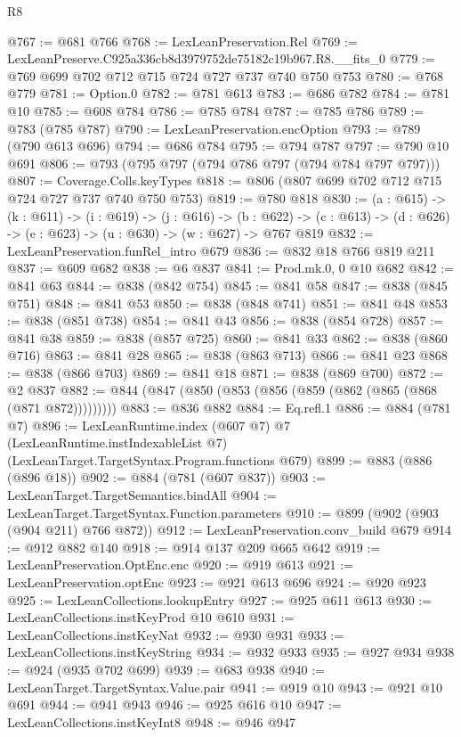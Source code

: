 \begin{lexlean}{R8}
\begin{coremodule}
@767 := @681 @766
@768 := LexLeanPreservation.Rel
@769 := LexLeanPreserve.C925a336cb8d3979752de75182c19b967.R8.__fits_0
@779 := @769 @699 @702 @712 @715 @724 @727 @737 @740 @750 @753
@780 := @768 @779
@781 := Option.{0}
@782 := @781 @613
@783 := @686 @782
@784 := @781 @10
@785 := @608 @784
@786 := @785 @784
@787 := @785 @786
@789 := @783 (@785 @787)
@790 := LexLeanPreservation.encOption
@793 := @789 (@790 @613 @696)
@794 := @686 @784
@795 := @794 @787
@797 := @790 @10 @691
@806 := @793 (@795 @797 (@794 @786 @797 (@794 @784 @797 @797)))
@807 := Coverage.Colls.keyTypes
@818 := @806 (@807 @699 @702 @712 @715 @724 @727 @737 @740 @750 @753)
@819 := @780 @818
@830 := (a : @615) ->
  (k : @611) ->
  (i : @619) ->
  (j : @616) ->
  (b : @622) -> (c : @613) -> (d : @626) -> (e : @623) -> (u : @630) -> (w : @627) -> @767 @819
@832 := LexLeanPreservation.funRel_intro @679
@836 := @832 @18 @766 @819 @211
@837 := @609 @682
@838 := @6 @837
@841 := Prod.mk.{0, 0} @10 @682
@842 := @841 @63
@844 := @838 (@842 @754)
@845 := @841 @58
@847 := @838 (@845 @751)
@848 := @841 @53
@850 := @838 (@848 @741)
@851 := @841 @48
@853 := @838 (@851 @738)
@854 := @841 @43
@856 := @838 (@854 @728)
@857 := @841 @38
@859 := @838 (@857 @725)
@860 := @841 @33
@862 := @838 (@860 @716)
@863 := @841 @28
@865 := @838 (@863 @713)
@866 := @841 @23
@868 := @838 (@866 @703)
@869 := @841 @18
@871 := @838 (@869 @700)
@872 := @2 @837
@882 := @844 (@847 (@850 (@853 (@856 (@859 (@862 (@865 (@868 (@871 @872)))))))))
@883 := @836 @882
@884 := Eq.refl.{1}
@886 := @884 (@781 @7)
@896 := LexLeanRuntime.index
    (@607 @7)
    @7
    (LexLeanRuntime.instIndexableList @7)
    (LexLeanTarget.TargetSyntax.Program.functions @679)
@899 := @883 (@886 (@896 @18))
@902 := @884 (@781 (@607 @837))
@903 := LexLeanTarget.TargetSemantics.bindAll
@904 := LexLeanTarget.TargetSyntax.Function.parameters
@910 := @899 (@902 (@903 (@904 @211) @766 @872))
@912 := LexLeanPreservation.conv_build @679
@914 := @912 @882 @140
@918 := @914 @137 @209 @665 @642
@919 := LexLeanPreservation.OptEnc.enc
@920 := @919 @613
@921 := LexLeanPreservation.optEnc
@923 := @921 @613 @696
@924 := @920 @923
@925 := LexLeanCollections.lookupEntry
@927 := @925 @611 @613
@930 := LexLeanCollections.instKeyProd @10 @610
@931 := LexLeanCollections.instKeyNat
@932 := @930 @931
@933 := LexLeanCollections.instKeyString
@934 := @932 @933
@935 := @927 @934
@938 := @924 (@935 @702 @699)
@939 := @683 @938
@940 := LexLeanTarget.TargetSyntax.Value.pair
@941 := @919 @10
@943 := @921 @10 @691
@944 := @941 @943
@946 := @925 @616 @10
@947 := LexLeanCollections.instKeyInt8
@948 := @946 @947

\end{coremodule}
\end{lexlean}
